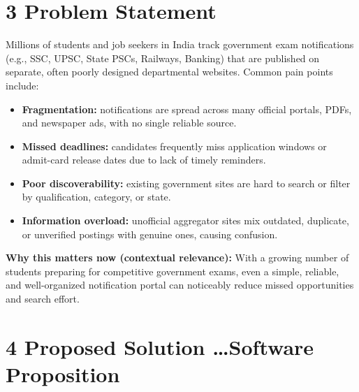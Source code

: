 \documentclass[11pt,a4paper]{article}
\begin{document}
\section*{3 Problem Statement}
Millions of students and job seekers in India track government exam notifications
(e.g., SSC, UPSC, State PSCs, Railways, Banking) that are published on separate,
often poorly designed departmental websites. Common pain points include:
\begin{itemize}[leftmargin=1.5em]
  \item \textbf{Fragmentation:} notifications are spread across many official
  portals, PDFs, and newspaper ads, with no single reliable source.
  \item \textbf{Missed deadlines:} candidates frequently miss application windows
  or admit-card release dates due to lack of timely reminders.
  \item \textbf{Poor discoverability:} existing government sites are hard to
  search or filter by qualification, category, or state.
  \item \textbf{Information overload:} unofficial aggregator sites mix outdated,
  duplicate, or unverified postings with genuine ones, causing confusion.
\end{itemize}
\textbf{Why this matters now (contextual relevance):} With a growing number of
students preparing for competitive government exams, even a simple, reliable,
and well-organized notification portal can noticeably reduce missed opportunities
and search effort.

\section*{4 Proposed Solution \dots Software Proposition}
\end{document}

